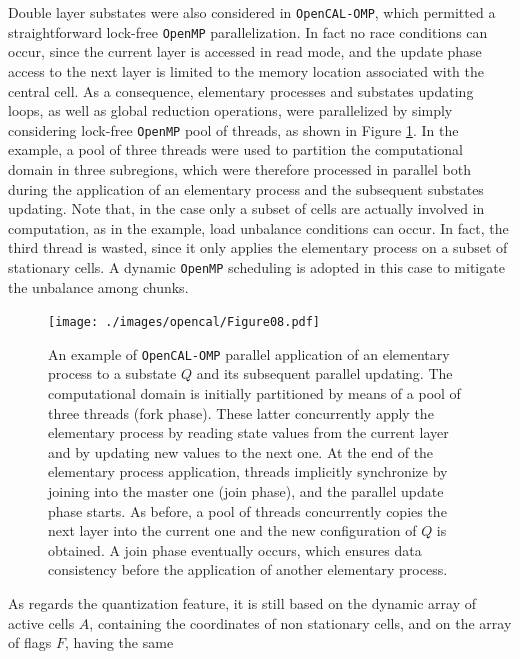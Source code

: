 Double layer substates were also considered in \texttt{OpenCAL-OMP}, which permitted a straightforward lock-free \texttt{OpenMP} parallelization. In fact no race conditions can occur, since the current layer is accessed in read mode, and the update phase access to the next layer is limited to the memory location associated with
the central cell. As a consequence, elementary processes and
substates updating loops, as well as global reduction operations,
were parallelized by simply considering lock-free \texttt{OpenMP} pool of
threads, as shown in Figure \ref{fig:pool_of_threads}. In the
example, a pool of three threads were used to partition the
computational domain in three subregions, which were therefore
processed in parallel both during the application of an elementary
process and the subsequent substates updating. Note that, in the
case only a subset of cells are actually involved in computation, as
in the example, load unbalance conditions can occur. In fact, the
third thread is wasted, since it only applies the elementary process
on a subset of stationary cells. A dynamic \texttt{OpenMP} scheduling is
adopted in this case to mitigate the unbalance among chunks.
\begin{figure}
	\begin{center}
		\texttt{[image: ./images/opencal/Figure08.pdf]}
		\caption[An example of \texttt{OpenCAL-OMP} parallel application of an elementary process to a substate $Q$ and its subsequent parallel updating.]{An example of \texttt{OpenCAL-OMP} parallel application of an elementary process to a substate $Q$ and its subsequent parallel updating. The
			computational domain is initially partitioned by means of a pool of
			three threads (fork phase). These latter concurrently apply the
			elementary process by reading state values from the current layer and by updating new values to the next one. At the end of the elementary process application, threads implicitly synchronize by joining into the master one (join phase), and the parallel update phase starts. As before, a pool of threads concurrently copies the next layer into the current one and the new configuration of $Q$ is obtained. A join phase eventually occurs, which ensures data consistency before the application of another elementary process.}
		\label{fig:pool_of_threads}
	\end{center}
\end{figure}
As regards the quantization feature, it is still based on the
dynamic array of active cells $A$, containing the coordinates of non
stationary cells, and on the array of flags $F$, having the same
